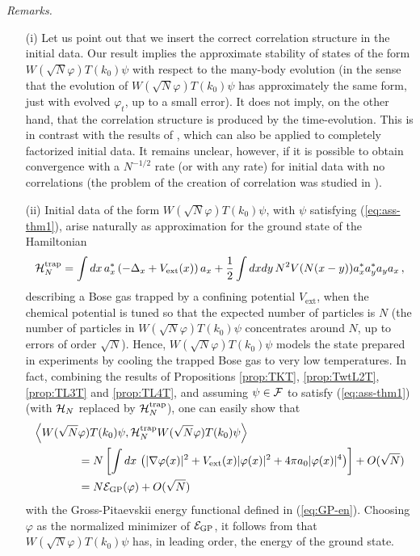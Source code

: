 \documentclass[11pt,a4paper]{article}
\newcommand{\cF}{{\cal F}}
\newcommand{\cE}{{\cal E}}
\newcommand{\cH}{{\cal H}}
\begin{document}
{\it Remarks.}
\begin{itemize}
\item[(i)] Let us point out that we insert the correct correlation structure in the initial data. Our result implies the approximate stability of states of the form $W(\sqrt{N} \varphi) T(k_0) \psi$ with respect to the many-body evolution (in the sense that the evolution of $W(\sqrt{N} \varphi) T(k_0) \psi$ has approximately the same form, just with evolved $\varphi_t$, up to a small error). It does not imply, on the other hand, that the correlation structure is produced by the time-evolution. This is in contrast with the results of \cite{ESY1,ESY2,ESY3,ESY4}, which can also be applied to completely factorized initial data. It remains unclear, however, if it is possible to obtain convergence with a $N^{-1/2}$ rate (or with any rate) for initial data with no correlations (the problem of the creation of correlation was studied in \cite{EMS}).
\item[(ii)] Initial data of the form $W(\sqrt{N}\varphi) T(k_0)\psi$, with $\psi$ satisfying (\ref{eq:ass-thm1}), arise naturally as approximation for the ground state of the Hamiltonian 
\[ \cH_N^{\text{trap}} = \int dx \, a_x^* \left( -\Delta_x + V_{\text{ext}} (x) \right) a_x + \frac{1}{2} \int dx dy \, N^2 V (N (x-y)) a_x^* a_y^* a_y a_x \, , \]
describing a Bose gas trapped by a confining potential $V_{\text{ext}}$, when the chemical potential is tuned so that the expected number of particles is $N$ (the number of particles in  $W(\sqrt{N}\varphi) T(k_0)\psi$ concentrates around $N$, up to errors of order $\sqrt{N}$). Hence, $W(\sqrt{N}\varphi) T(k_0)\psi$ models the state prepared in experiments by cooling the trapped Bose gas to very low temperatures. In fact, combining the results of Propositions \ref{prop:TKT}, \ref{prop:TwtL2T}, \ref{prop:TL3T} and \ref{prop:TL4T}, and assuming $\psi \in \cF$ to satisfy (\ref{eq:ass-thm1}) (with $\cH_N$ replaced by $\cH_N^{\text{trap}}$), one can easily show that 
\[ \begin{split} \Big\langle W(\sqrt{N} &\varphi) T(k_0)\psi, \cH_N^{\text{trap}} W(\sqrt{N}\varphi) T(k_0)\psi \Big\rangle \\ &= N \left[ \int dx \, \left( |\nabla \varphi (x)|^2 + V_{\text{ext}} (x) |\varphi (x)|^2 + 4 \pi a_0 |\varphi (x)|^4 \right) \right] + O (\sqrt{N}) \\ & = N \cE_{\text{GP}} (\varphi) + O (\sqrt{N}) \end{split} \]
with the Gross-Pitaevskii energy functional defined in (\ref{eq:GP-en}). Choosing $\varphi$ as the normalized minimizer of $\cE_{\text{GP}}$, it follows from \cite{LSY} that $W(\sqrt{N}\varphi) T(k_0)\psi$ has, in leading order, the energy of the ground state. 

\end{itemize}
\end{document}
